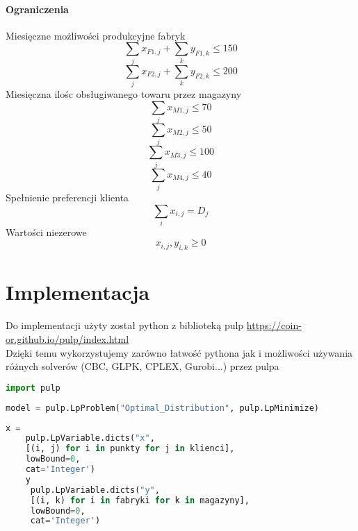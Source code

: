 \documentclass[12pt]{article}
\begin{document}
\paragraph{Ograniczenia}
Miesięczne możliwości produkcyjne fabryk
\begin{equation}
    \sum_j x_{F1, j} + \sum_k y_{F1, k} \leq 150
\end{equation}
\begin{equation}
    \sum_j x_{F2, j} + \sum_k y_{F2, k} \leq 200
\end{equation}
Miesięczna ilośc obsługiwanego towaru przez magazyny 
\begin{equation}
    \sum_j x_{M1, j} \leq 70
\end{equation}
\begin{equation}
    \sum_j x_{M2, j} \leq 50
\end{equation}
\begin{equation}
    \sum_j x_{M3, j} \leq 100
\end{equation}
\begin{equation}
    \sum_j x_{M4, j} \leq 40
\end{equation}
Spełnienie preferencji klienta 
\begin{equation}
    \sum_i x_{i, j} = D_j
\end{equation}
Wartości niezerowe 
\begin{equation}
    x_{i, j}, y_{i, k} \geq 0
\end{equation}

\section{Implementacja}
Do implementacji użyty został python z biblioteką pulp \href{https://coin-or.github.io/pulp/index.html}{https://coin-or.github.io/pulp/index.html} \\ 
Dzięki temu wykorzystujemy zarówno łatwość pythona jak i możliwości używania różnych solverów (CBC, GLPK, CPLEX, Gurobi...) przez pulpa \\ 
\begin{lstlisting}[language=Python, caption={Import bilbioteki pulp}]
    import pulp
\end{lstlisting}
\begin{lstlisting}[language=Python, caption={Iniicjalizacja modelu}]
    model = pulp.LpProblem("Optimal_Distribution", pulp.LpMinimize)
\end{lstlisting}

\begin{lstlisting}[language=Python, caption={Zmienne decyzyjne}]
    x =
    pulp.LpVariable.dicts("x",
    [(i, j) for i in punkty for j in klienci],
    lowBound=0,
    cat='Integer')
    y 
     pulp.LpVariable.dicts("y",
     [(i, k) for i in fabryki for k in magazyny],
     lowBound=0,
     cat='Integer')
\end{lstlisting}
\end{document}
